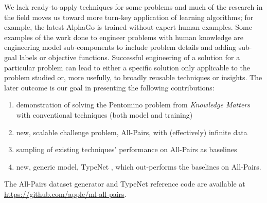 We lack ready-to-apply techniques for some problems and much of the
research in the field moves us toward more turn-key application of
learning algorithms; for example, the latest AlphaGo
\cite{silver2017mastering} is trained without expert human examples. 
Some examples of the work done to engineer problems with human knowledge
are engineering model sub-components to include problem details and 
adding sub-goal labels or objective functions.  Successful engineering of a 
solution for a particular problem can lead to either a specific solution only 
applicable to the problem studied or, more usefully, to broadly reusable 
techniques or insights.  The later outcome is our goal in presenting the following 
contributions:
\begin{enumerate}
  \item demonstration of solving the Pentomino problem from {\em Knowledge Matters} \cite{gulccehre2016knowledge} with conventional techniques (both model and training)
  \item new, scalable challenge problem, All-Pairs, with (effectively) infinite data \cite{allpairs2018}
  \item sampling of existing techniques' performance on All-Pairs as baselines
  \item new, generic model, TypeNet \cite{allpairs2018}, which out-performs the baselines on All-Pairs.
\end{enumerate}
The All-Pairs dataset generator and TypeNet reference code are available at \href{https://github.com/apple/ml-all-pairs}{https://github.com/apple/ml-all-pairs}.
